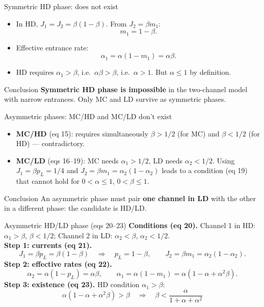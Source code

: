 \documentclass[aspectratio=169,10pt]{beamer}
\begin{document}
\begin{frame}{Symmetric HD phase: does not exist}
  \begin{itemize}
    \item In HD, $J_1 = J_2 = \beta(1-\beta)$. From $J_2 = \beta m_1$:
      \[
        m_1 = 1 - \beta.
      \]
    \item Effective entrance rate:
      \[
        \alpha_1 = \alpha(1 - m_1) = \alpha\beta.
      \]
    \item HD requires $\alpha_1 > \beta$, i.e.\ $\alpha\beta > \beta$, i.e.\
      $\alpha > 1$. But $\alpha \le 1$ by definition.
  \end{itemize}
  \begin{block}{Conclusion}
    \textbf{Symmetric HD phase is impossible} in the two-channel model with
    narrow entrances. Only MC and LD survive as symmetric phases.
  \end{block}
\end{frame}

\begin{frame}{Asymmetric phases: MC/HD and MC/LD don't exist}
  \small
  \begin{itemize}
    \item \textbf{MC/HD} (eq 15): requires simultaneously $\beta>1/2$
      (for MC) and $\beta<1/2$ (for HD) --- contradictory.
    \item \textbf{MC/LD} (eqs 16--19): MC needs $\alpha_1 > 1/2$, LD needs
      $\alpha_2 < 1/2$. Using $J_1 = \beta p_L = 1/4$ and
      $J_2 = \beta m_1 = \alpha_2(1-\alpha_2)$ leads to a condition (eq 19)
      that cannot hold for $0 < \alpha \le 1$, $0 < \beta \le 1$.
  \end{itemize}
  \begin{block}{Conclusion}
    An asymmetric phase must pair \textbf{one channel in LD} with the other in
    a different phase: the candidate is HD/LD.
  \end{block}
\end{frame}

\begin{frame}{Asymmetric HD/LD phase (eqs 20--23)}
  \small
  \textbf{Conditions (eq 20).}
  Channel 1 in HD: $\alpha_1 > \beta$, $\beta < 1/2$;\quad
  Channel 2 in LD: $\alpha_2 < \beta$, $\alpha_2 < 1/2$.
  \\
\textbf{Step 1: currents (eq 21).}
  \[
    J_1 = \beta p_L = \beta(1-\beta)
    \quad\Rightarrow\quad p_L = 1 - \beta,
    \qquad
    J_2 = \beta m_1 = \alpha_2(1-\alpha_2).
  \]
  \textbf{Step 2: effective rates (eq 22).}
  \[
    \alpha_2 = \alpha(1 - p_L) = \alpha\beta, \qquad
    \alpha_1 = \alpha(1 - m_1) = \alpha(1 - \alpha + \alpha^2\beta).
  \]
  \textbf{Step 3: existence (eq 23).}
  HD condition $\alpha_1 > \beta$:
  \[
    \alpha(1 - \alpha + \alpha^2\beta) > \beta
    \quad\Longrightarrow\quad
    \beta < \frac{\alpha}{1 + \alpha + \alpha^2}
  \]
\end{frame}
\end{document}
